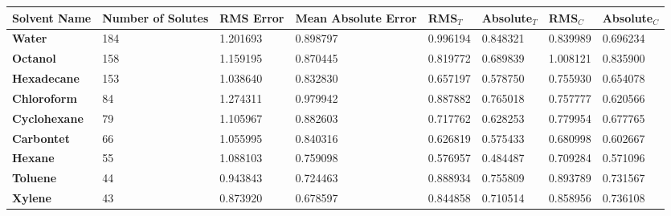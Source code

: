 \documentclass{amsart}
\begin{document}
 
\begin{center}
\begin{tabular}{|l|l|l|l|l|l|l|l|} 
\hline  
\textbf{Solvent Name}&\textbf{Number of Solutes}&\textbf{RMS Error}&\textbf{Mean Absolute Error}&\textbf{RMS$_{T}$}&\textbf{Absolute$_{T}$}&\textbf{RMS$_{C}$}&\textbf{Absolute$_{C}$} \\ \hline
\hline 
\textbf{Water}&184&1.201693&0.898797&0.996194&0.848321&0.839989&0.696234 \\ \hline 
\textbf{Octanol}&158&1.159195&0.870445&0.819772&0.689839&1.008121&0.835900 \\ \hline 
\textbf{Hexadecane}&153&1.038640&0.832830&0.657197&0.578750&0.755930&0.654078 \\ \hline 
\textbf{Chloroform}& 84&1.274311&0.979942&0.887882&0.765018&0.757777&0.620566 \\ \hline 
\textbf{Cyclohexane}& 79&1.105967&0.882603&0.717762&0.628253&0.779954&0.677765 \\ \hline 
\textbf{Carbontet}& 66&1.055995&0.840316&0.626819&0.575433&0.680998&0.602667 \\ \hline 
\textbf{Hexane}& 55&1.088103&0.759098&0.576957&0.484487&0.709284&0.571096 \\ \hline 
\textbf{Toluene}& 44&0.943843&0.724463&0.888934&0.755809&0.893789&0.731567 \\ \hline 
\textbf{Xylene}& 43&0.873920&0.678597&0.844858&0.710514&0.858956&0.736108 \\ \hline 
\end{tabular} 
\end{center} 
\end{document}
